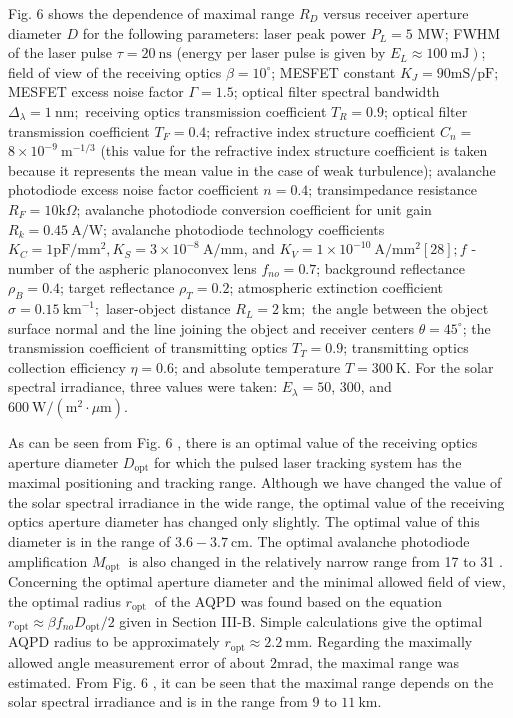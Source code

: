 \documentclass[10pt]{article}
\begin{document}
Fig. 6 shows the dependence of maximal range \(R_{D}\) versus receiver aperture diameter \(D\) for the following parameters: laser peak power \(P_{L}=5\) MW; FWHM of the laser pulse \(\tau=20 \mathrm{~ns}\) (energy per laser pulse is given by \(\left.E_{L} \approx 100 \mathrm{~mJ}\right)\); field of view of the receiving optics \(\beta=10^{\circ}\); MESFET constant \(K_{J}=90 \mathrm{mS} / \mathrm{pF} ;\) MESFET excess noise factor \(\Gamma=1.5\); optical filter spectral bandwidth \(\Delta_{\lambda}=1 \mathrm{~nm} ;\) receiving optics transmission coefficient \(T_{R}=0.9\); optical filter transmission coefficient \(T_{F}=0.4\); refractive index structure coefficient \(C_{n}=\) \(8 \times 10^{-9} \mathrm{~m}^{-1 / 3}\) (this value for the refractive index structure coefficient is taken because it represents the mean value in the case of weak turbulence); avalanche photodiode excess noise factor coefficient \(n=0.4\); transimpedance resistance \(R_{F}=10 \mathrm{k} \Omega\); avalanche photodiode conversion coefficient for unit gain \(R_{k}=0.45 \mathrm{~A} / \mathrm{W}\); avalanche photodiode technology coefficients \(K_{C}=1 \mathrm{pF} / \mathrm{mm}^{2}, K_{S}=3 \times 10^{-8} \mathrm{~A} / \mathrm{mm}\), and \(K_{V}=1 \times 10^{-10} \mathrm{~A} / \mathrm{mm}^{2}[28] ; f\) -number of the aspheric planoconvex lens \(f_{n o}=0.7\); background reflectance \(\rho_{B}=0.4\); target reflectance \(\rho_{T}=0.2\); atmospheric extinction coefficient \(\sigma=0.15 \mathrm{~km}^{-1} ;\) laser-object distance \(R_{L}=2 \mathrm{~km} ;\) the angle between the object surface normal and the line joining the object and receiver centers \(\theta=45^{\circ}\); the transmission coefficient of transmitting optics \(T_{T}=0.9\); transmitting optics collection efficiency \(\eta=0.6\); and absolute temperature \(T=300 \mathrm{~K}\). For the solar spectral irradiance, three values were taken: \(E_{\lambda}=50\), 300, and \(600 \mathrm{~W} /\left(\mathrm{m}^{2} \cdot \mu \mathrm{m}\right)\).

As can be seen from Fig. 6 , there is an optimal value of the receiving optics aperture diameter \(D_{\mathrm{opt}}\) for which the pulsed laser tracking system has the maximal positioning and tracking range. Although we have changed the value of the solar spectral irradiance in the wide range, the optimal value of the receiving optics aperture diameter has changed only slightly. The optimal value of this diameter is in the range of \(3.6-3.7 \mathrm{~cm}\). The optimal avalanche photodiode amplification \(M_{\text {opt }}\) is also changed in the relatively narrow range from 17 to 31 . Concerning the optimal aperture diameter and the minimal allowed field of view, the optimal radius \(r_{\text {opt }}\) of the AQPD was found based on the equation \(r_{\mathrm{opt}} \approx \beta f_{n o} D_{\mathrm{opt}} / 2\) given in Section III-B. Simple calculations give the optimal AQPD radius to be approximately \(r_{\mathrm{opt}} \approx 2.2 \mathrm{~mm}\). Regarding the maximally allowed angle measurement error of about \(2 \mathrm{mrad}\), the maximal range was estimated. From Fig. 6 , it can be seen that the maximal range depends on the solar spectral irradiance and is in the range from 9 to \(11 \mathrm{~km}\).
\end{document}

